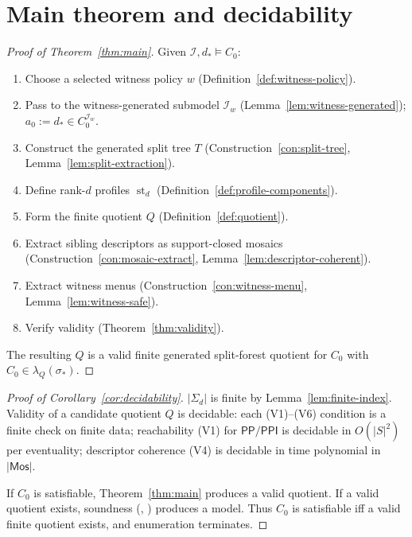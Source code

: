 \documentclass[11pt]{article}
\theoremstyle{definition}
\theoremstyle{remark}
\newcommand{\PP}{\mathsf{PP}}
\newcommand{\PPI}{\mathsf{PPI}}
\newcommand{\st}{\operatorname{st}}
\newcommand{\Mos}{\mathsf{Mos}}
\begin{document}
\section{Main theorem and decidability}
\label{sec:main}

\begin{proof}[Proof of Theorem~\ref{thm:main}]
Given $\mathcal{I},d_\ast \models C_0$:
\begin{enumerate}
\item Choose a selected witness policy $w$
  (Definition~\ref{def:witness-policy}).
\item Pass to the witness-generated submodel $\mathcal{I}_w$
  (Lemma~\ref{lem:witness-generated}); $a_0 := d_\ast \in
  C_0^{\mathcal{I}_w}$.
\item Construct the generated split tree $T$
  (Construction~\ref{con:split-tree}, Lemma~\ref{lem:split-extraction}).
\item Define rank-$d$ profiles $\st_d$
  (Definition~\ref{def:profile-components}).
\item Form the finite quotient $Q$
  (Definition~\ref{def:quotient}).
\item Extract sibling descriptors as support-closed mosaics
  (Construction~\ref{con:mosaic-extract},
  Lemma~\ref{lem:descriptor-coherent}).
\item Extract witness menus
  (Construction~\ref{con:witness-menu},
  Lemma~\ref{lem:witness-safe}).
\item Verify validity (Theorem~\ref{thm:validity}).
\end{enumerate}
The resulting $Q$ is a valid finite generated split-forest quotient
for $C_0$ with $C_0 \in \lambda_Q(\sigma_\ast)$.
\end{proof}

\begin{proof}[Proof of Corollary~\ref{cor:decidability}]
$|\Sigma_d|$ is finite by Lemma~\ref{lem:finite-index}.  Validity
of a candidate quotient $Q$ is decidable: each (V1)--(V6) condition
is a finite check on finite data; reachability (V1) for $\PP/\PPI$
is decidable in $O(|S|^2)$ per eventuality; descriptor coherence
(V4) is decidable in time polynomial in $|\Mos|$.

If $C_0$ is satisfiable, Theorem~\ref{thm:main} produces a valid
quotient.  If a valid quotient exists, soundness
(\cite[Theorem~1.20]{SplitForest},
\cite[Theorem~9.1]{GPT55Generated}) produces a model.  Thus $C_0$
is satisfiable iff a valid finite quotient exists, and enumeration
terminates.
\end{proof}
\end{document}
